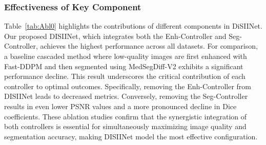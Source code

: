\documentclass{article}
\begin{document}
\subsubsection{Effectiveness of Key Component}

\begin{table}[h]
\centering
{}
\renewcommand{\tablename}{Table}
\caption{\normalfont\normalsize Ablation study of each component of the SII module.}
\label{tab:Abl0}
\end{table}

Table~\ref{tab:Abl0} highlights the contributions of different components in DiSIINet. Our proposed DISIINet, which integrates both the Enh-Controller and Seg-Controller, achieves the highest performance across all datasets. For comparison, a baseline cascaded method where low-quality images are first enhanced with Fast-DDPM and then segmented using MedSegDiff-V2 exhibits a significant performance decline. This result underscores the critical contribution of each controller to optimal outcomes. Specifically, removing the Enh-Controller from DISIINet leads to decreased metrics. Conversely, removing the Seg-Controller results in even lower PSNR values and a more pronounced decline in Dice coefficients. These ablation studies confirm that the synergistic integration of both controllers is essential for simultaneously maximizing image quality and segmentation accuracy, making DISIINet model the most effective configuration.
\end{document}

